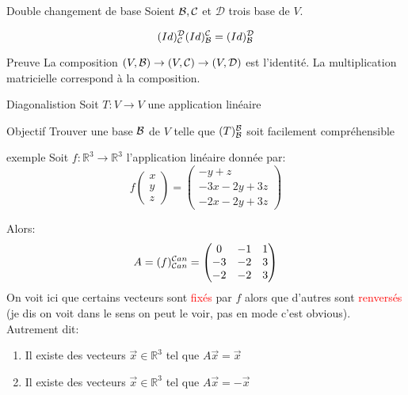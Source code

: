 \begin{parag}{Double changement de base}
    Soient $\mathcal{B}, \mathcal{C}$ et $\mathcal{D}$ trois base de $V$.
    \begin{formule}
        \[(Id)_{\mathcal{C}}^{\mathcal{D}}(Id)_{\mathcal{B}}^{\mathcal{C}} = (Id)_{\mathcal{B}}^{\mathcal{D}}\]
    \end{formule}
    \begin{subparag}{Preuve}
        La composition $(V, \mathcal{B}) \to (V, \mathcal{C}) \to (V, \mathcal{D})$ est l'identité. La multiplication matricielle correspond à la composition.
    \end{subparag}
\end{parag}

\begin{parag}{Diagonalistion}
    Soit $T: V \to V$ une application linéaire
    \begin{subparag}{Objectif}
        Trouver une base $\mathcal{B}$ de $V$ telle que $(T)_{\mathcal{B}}^{\mathcal{B}}$ soit facilement compréhensible
    \end{subparag}
    \begin{subparag}{exemple}
        Soit $f : \mathbb{R}^3 \to \mathbb{R}^3$ l'application linéaire donnée par:
        \[f\begin{pmatrix}
            x \\ y \\ z
        \end{pmatrix} = \begin{pmatrix}
            -y + z \\ -3x -2y + 3z\\
            -2x -2y + 3z
        \end{pmatrix}\]

        Alors:
        \[A = (f)_{\mathcal{C} an} ^{\mathcal{C} an} = \begin{pmatrix}
            0 & -1 & 1\\
            -3 & -2 & 3\\
            -2 & -2 & 3
        \end{pmatrix} \]
        On voit ici que certains vecteurs sont \textcolor{red}{fixés} par $f$ alors que d'autres sont \textcolor{red}{renversés} (je dis on voit dans le sens on peut le voir, pas en mode c'est obvious).\\
        Autrement dit:
        \begin{enumerate}
            \item Il existe des vecteurs $\vec{x} \in \mathbb{R}^3$ tel que $A\vec{x} = \vec{x}$
            \item Il existe des vecteurs $\vec{x} \in \mathbb{R}^3$ tel que $A\vec{x} = -\vec{x}$
        \end{enumerate}
        


\end{subparag}
\end{parag}
